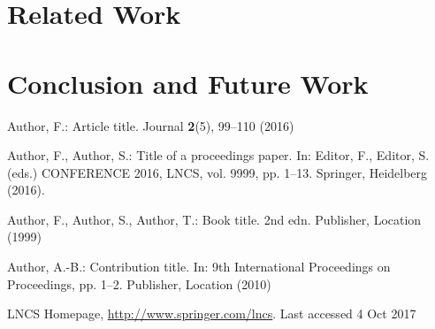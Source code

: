 \documentclass[runningheads]{llncs}
\begin{document}
\section{Related Work}



\newpage


\section{Conclusion and Future Work}


% 
%
%
% 
% 
%
\begin{thebibliography}{8}
Author, F.: Article title. Journal \textbf{2}(5), 99--110 (2016)

Author, F., Author, S.: Title of a proceedings paper. In: Editor,
F., Editor, S. (eds.) CONFERENCE 2016, LNCS, vol. 9999, pp. 1--13.
Springer, Heidelberg (2016). 

Author, F., Author, S., Author, T.: Book title. 2nd edn. Publisher,
Location (1999)

Author, A.-B.: Contribution title. In: 9th International Proceedings
on Proceedings, pp. 1--2. Publisher, Location (2010)

LNCS Homepage, \url{http://www.springer.com/lncs}. Last accessed 4
Oct 2017
\end{thebibliography}
\end{document}
